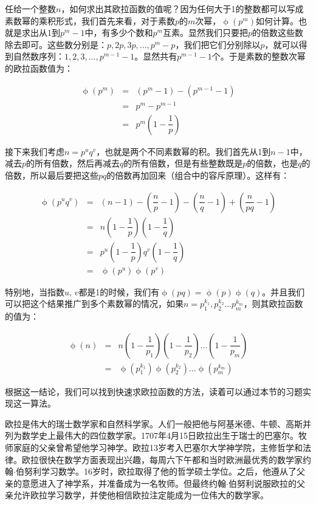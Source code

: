 \documentclass{article}
\begin{document}
任给一个整数$n$，如何求出其欧拉函数的值呢？因为任何大于1的整数都可以写成素数幂的乘积形式，我们首先来看，对于素数$p$的$m$次幂，$\upphi(p^m)$如何计算。也就是求出从1到$p^m-1$中，有多少个数和$p^m$互素。显然我们只要把$p$的倍数这些数除去即可。这些数分别是：$p, 2p, 3p, ..., p^m - p$，我们把它们分别除以$p$，就可以得到自然数序列：$1, 2, 3, ..., p^{m-1} - 1$。显然共有$p^{m-1} - 1$个。于是素数的整数次幂的欧拉函数值为：

\[
\begin{array}{rcl}
\upphi(p^m) & = & (p^m - 1) - (p^{m-1} - 1) \\
            & = & p^m - p^{m-1} \\
            & = & p^m(1-\dfrac{1}{p})
\end{array}
\]

接下来我们考虑$n = p^uq^v$，也就是两个不同素数幂的积。我们首先从1到$n-1$中，减去$p$的所有倍数，然后再减去$q$的所有倍数，但是有些整数既是$p$的倍数，也是$q$的倍数，所以最后要把这些$pq$的倍数再加回来（组合中的容斥原理）。这样有：

\[
\begin{array}{rcl}
\upphi(p^uq^v) & = & (n - 1) - (\dfrac{n}{p} - 1) - (\dfrac{n}{q} - 1) + (\dfrac{n}{pq} - 1) \\
          & = & n(1 - \dfrac{1}{p})(1 - \dfrac{1}{q}) \\
          & = & p^u(1 - \dfrac{1}{p})q^v(1 - \dfrac{1}{q}) \\
          & = & \upphi(p^u)\upphi(p^v)
\end{array}
\]

特别地，当指数$u$, $v$都是1的时候，我们有$\upphi(pq) = \upphi(p)\upphi(q)$。并且我们可以把这个结果推广到多个素数幂的情况，如果$n = p_1^{k_1}, p_2^{k_2}...p_m^{k_m}$，则其欧拉函数的值为：

\[
\begin{array}{rcl}
\upphi(n) & = & n(1-\dfrac{1}{p_1})(1-\dfrac{1}{p_2})...(1-\dfrac{1}{p_m}) \\
    & = & \upphi(p_1^{k_1})\upphi(p_2^{k_2})...\upphi(p_m^{k_m})
\end{array}
\]

根据这一结论，我们可以找到快速求欧拉函数的方法，读着可以通过本节的习题实现这一算法。

\vspace{5mm}

欧拉是伟大的瑞士数学家和自然科学家。人们一般把他与阿基米德、牛顿、高斯并列为数学史上最伟大的四位数学家。1707年4月15日欧拉出生于瑞士的巴塞尔。牧师家庭的父亲曾希望他学习神学。欧拉13岁考入巴塞尔大学神学院，主修哲学和法律。欧拉很快在数学方面表现出兴趣，每周六下午都和当时欧洲最优秀的数学家约翰$\cdot$伯努利学习数学。16岁时，欧拉取得了他的哲学硕士学位。之后，他遵从了父亲的意愿进入了神学系，并准备成为一名牧师。但最终约翰$\cdot$伯努利说服欧拉的父亲允许欧拉学习数学，并使他相信欧拉注定能成为一位伟大的数学家。
\end{document}
